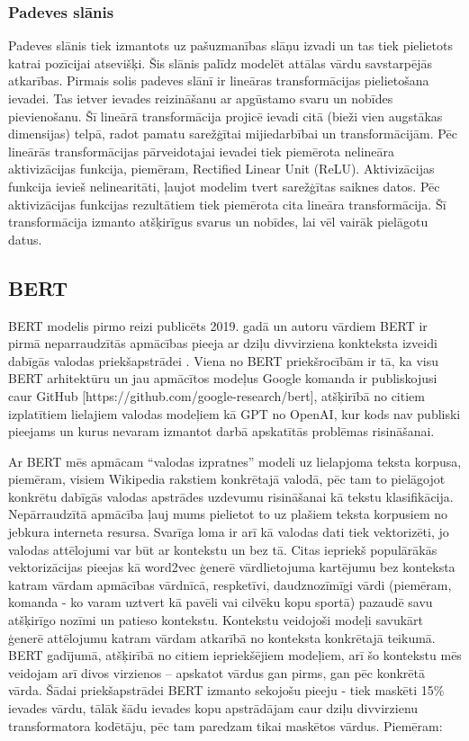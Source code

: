 \subsubsection{Padeves slānis}
Padeves slānis tiek izmantots uz pašuzmanības slāņu izvadi un tas tiek pielietots katrai pozīcijai atsevišķi. Šis slānis palīdz modelēt attālas vārdu savstarpējās atkarības. Pirmais solis padeves slānī ir lineāras transformācijas pielietošana ievadei. Tas ietver ievades reizināšanu ar apgūstamo svaru un nobīdes pievienošanu. Šī lineārā transformācija projicē ievadi citā (bieži vien augstākas dimensijas) telpā, radot pamatu sarežģītai mijiedarbībai un transformācijām. Pēc lineārās transformācijas pārveidotajai ievadei tiek piemērota nelineāra aktivizācijas funkcija, piemēram, Rectified Linear Unit (ReLU). Aktivizācijas funkcija ievieš nelinearitāti, ļaujot modelim tvert sarežģītas saiknes datos. Pēc aktivizācijas funkcijas rezultātiem tiek piemērota cita lineāra transformācija. Šī transformācija izmanto atšķirīgus svarus un nobīdes, lai vēl vairāk pielāgotu datus.

\subsection{BERT}
BERT modelis pirmo reizi publicēts 2019. gadā un autoru vārdiem BERT ir pirmā neparraudzītās apmācības pieeja ar dziļu divvirziena konkteksta izveidi dabīgās valodas priekšapstrādei \cite{devlin2019bert}. Viena no BERT priekšrocībām ir tā, ka visu BERT arhitektūru un jau apmācītos modeļus Google komanda ir publiskojusi caur GitHub [https://github.com/google-research/bert], atšķirībā no citiem izplatītiem lielajiem valodas modeļiem kā GPT no OpenAI, kur kods nav publiski pieejams un kurus nevaram izmantot darbā apskatītās problēmas risināšanai.

Ar BERT mēs apmācam “valodas izpratnes” modeli uz lielapjoma teksta korpusa, piemēram, visiem Wikipedia rakstiem konkrētajā valodā, pēc tam to pielāgojot konkrētu dabīgās valodas apstrādes uzdevumu risināšanai kā tekstu klasifikācija. Nepārraudzītā apmācība ļauj mums pielietot to uz plašiem teksta korpusiem no jebkura interneta resursa. Svarīga loma ir arī kā valodas dati tiek vektorizēti, jo valodas attēlojumi var būt ar kontekstu un bez tā. Citas iepriekš populārākās vektorizācijas pieejas kā word2vec ģenerē vārdlietojuma kartējumu bez konteksta katram vārdam apmācības vārdnīcā, respketīvi, daudznozīmīgi vārdi (piemēram, komanda - ko varam uztvert kā pavēli vai cilvēku kopu sportā) pazaudē savu atšķirīgo nozīmi un patieso kontekstu. Kontekstu veidojoši modeļi savukārt ģenerē attēlojumu katram vārdam atkarībā no konteksta konkrētajā teikumā. BERT gadījumā, atšķirībā no citiem iepriekšējiem modeļiem, arī šo kontekstu mēs veidojam arī divos virzienos – apskatot vārdus gan pirms, gan pēc konkrētā vārda.
Šādai priekšapstrādei BERT izmanto sekojošu pieeju -  tiek maskēti 15\% ievades vārdu, tālāk šādu ievades kopu apstrādājam caur dziļu divvirzienu transformatora kodētāju, pēc tam paredzam tikai maskētos vārdus. Piemēram:

